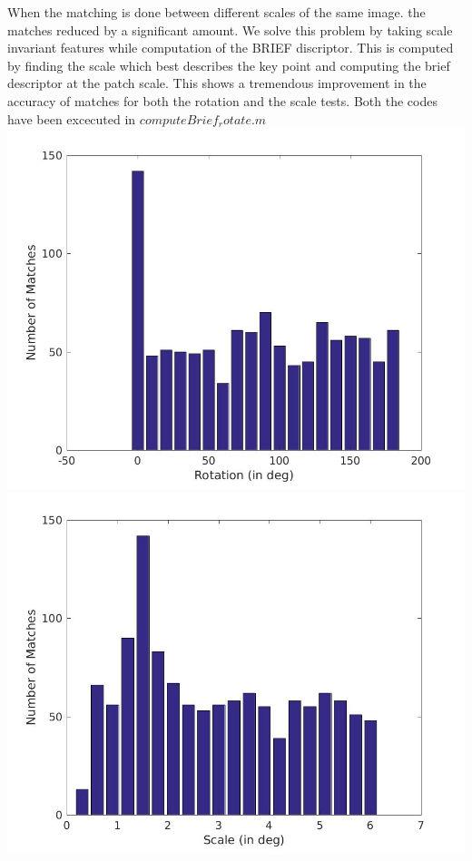 \documentclass[12pt]{article}
\newenvironment{problem}[2][Problem]{\begin{trivlist}
\item[\hskip \labelsep {\bfseries #1}\hskip \labelsep {\bfseries #2.}]}{\end{trivlist}}
\begin{document}
\begin{problem}{7.2}
When the matching is done between different scales of the same image. the matches reduced by a significant amount. We solve this problem by taking scale invariant features while computation of the BRIEF discriptor. This is computed by finding the scale which best describes the key point and computing the brief descriptor at the patch scale. This shows a tremendous improvement in the accuracy of matches for both the rotation and the scale tests. Both the codes have been excecuted in $computeBrief_rotate.m$\\


\includegraphics[scale=0.2]{results/EC2_RotErr}
\includegraphics[scale=0.2]{results/EC2_ScalErr}
\end{problem}
\end{document}
